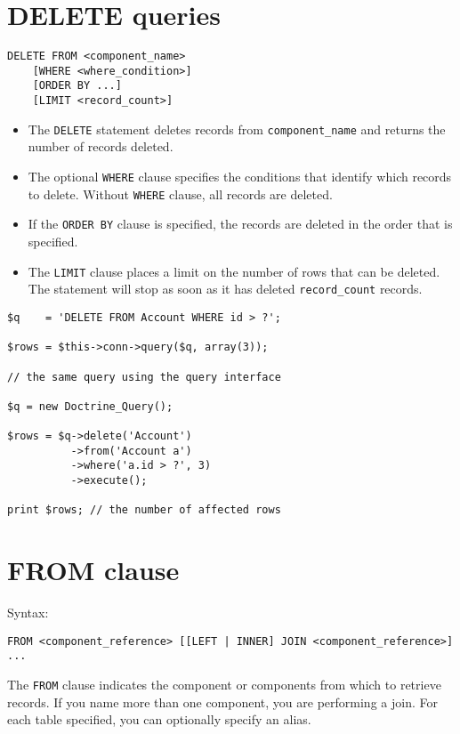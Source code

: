 \documentclass[11pt,a4paper]{report}
\begin{document}
\section{DELETE queries}
\begin{verbatim}
DELETE FROM <component_name>
    [WHERE <where_condition>]
    [ORDER BY ...]
    [LIMIT <record_count>]
\end{verbatim}

\begin{itemize}
\item{The \texttt{DELETE} statement deletes records from \texttt{component\_name} and returns the number of records deleted.}
\item{The optional \texttt{WHERE} clause specifies the conditions that identify which records to delete. Without \texttt{WHERE} clause, all records are deleted.}
\item{If the \texttt{ORDER BY} clause is specified, the records are deleted in the order that is specified.}
\item{The \texttt{LIMIT} clause places a limit on the number of rows that can be deleted. The statement will stop as soon as it has deleted \texttt{record\_count} records.}
\end{itemize}
\begin{verbatim}
$q    = 'DELETE FROM Account WHERE id > ?';

$rows = $this->conn->query($q, array(3));

// the same query using the query interface

$q = new Doctrine_Query();

$rows = $q->delete('Account')
          ->from('Account a')
          ->where('a.id > ?', 3)
          ->execute();

print $rows; // the number of affected rows
\end{verbatim}

\section{FROM clause}
Syntax:

\begin{verbatim}
FROM <component_reference> [[LEFT | INNER] JOIN <component_reference>] ...
\end{verbatim}

The \texttt{FROM} clause indicates the component or components from which to retrieve records. If you name more than one component, you are performing a join. For each table specified, you can optionally specify an alias.
\end{document}

